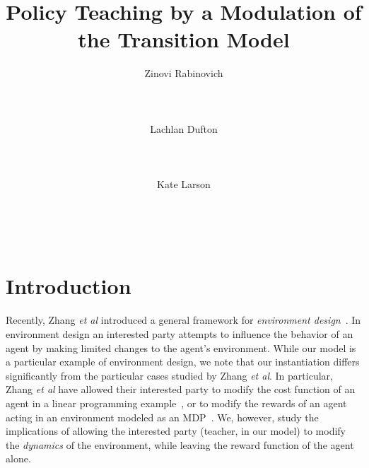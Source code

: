 \documentclass[letterpaper]{aamas2009}
\author{\alignauthor Zinovi Rabinovich\\
  \affaddr{Electronics and Computer Science}\\
  \affaddr{University of Southampton}\\
  \affaddr{Southampton, United Kingdom}\\
  \email{zr@ecs.soton.ac.uk}
\alignauthor Lachlan Dufton\\ 
  \affaddr{Cheriton School of Computer Science}\\
  \affaddr{University of Waterloo}\\
  \affaddr{Waterloo, Canada}\\
  \email{ltdufton@cs.uwaterloo.ca}
\alignauthor Kate Larson\\
  \affaddr{Cheriton School of Computer Science}\\
  \affaddr{University of Waterloo}\\
  \affaddr{Waterloo, Canada}\\
  \email{klarson@cs.uwaterloo.ca}
}
\title{Policy  Teaching by a Modulation of the Transition Model}
\begin{document}
\maketitle

\section{Introduction}
\nocite{taylor_PhD_2008}
\nocite{taylor_stone_2009}
\nocite{fleming_hernandez-hernandez_CDC_97}
\nocite{todorov_2009_framework_sup}
\nocite{todorov_2009_framework}
\nocite{ng_russell_2000}
\nocite{zhang_parkes_2008}
\nocite{zhang_parkes_2009_ed}
\nocite{dufton_larson_2009}
\nocite{banerjee_peng_2005}

Recently, Zhang \emph{et al} introduced a general framework for \emph{environment design}~\cite{Zhang09:General}. In environment design an interested party attempts to influence the behavior of an agent by making limited changes to the agent's environment.  While our model is a particular example of environment design, we note that our instantiation differs significantly from the particular cases studied by Zhang \emph{et al}.  
In particular, Zhang \emph{et al} have allowed their interested party to modify the cost function of an agent in a linear programming example~\cite{Zhang09:General}, or to modify the rewards of an agent acting in an environment modeled as an MDP~\cite{zhang_parkes_2008,Zhang09:Policy}.
We, however, study the implications of allowing the interested party (teacher, in our model) to modify the \emph{dynamics} of the environment, while leaving the reward function of the agent alone.  




\end{document}
